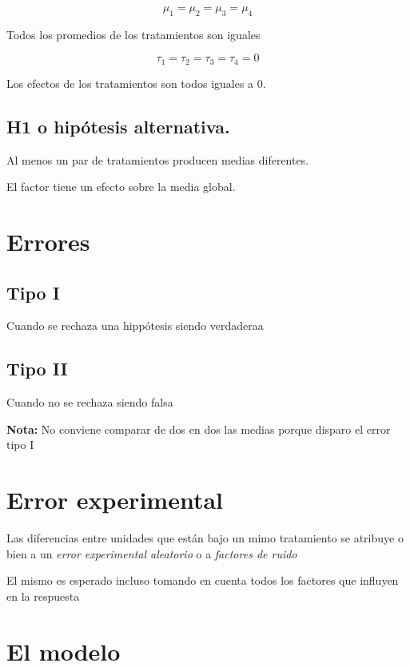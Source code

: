 \documentclass[
]{article}
\begin{document}
\[
\mu_1=\mu_2=\mu_3=\mu_4
\]

Todos los promedios de los tratamientos son iguales

\[
\tau_1=\tau_2=\tau_3=\tau_4=0
\]

Los efectos de los tratamientos son todos iguales a 0.

\subsection{H1 o hipótesis
alternativa.}\label{h1-o-hipuxf3tesis-alternativa.}

Al menos un par de tratamientos producen medias diferentes.

El factor tiene un efecto sobre la media global.

\section{Errores}\label{errores}

\subsection{Tipo I}\label{tipo-i}

Cuando se rechaza una hippótesis siendo verdaderaa

\subsection{Tipo II}\label{tipo-ii}

Cuando no se rechaza siendo falsa

\textbf{Nota:} No conviene comparar de dos en dos las medias porque
disparo el error tipo I

\section{Error experimental}\label{error-experimental}

Las diferencias entre unidades que están bajo un mimo tratamiento se
atribuye o bien a un \emph{error experimental aleatorio} o a
\emph{factores de ruido}

El mismo es esperado incluso tomando en cuenta todos los factores que
influyen en la respuesta

\section{El modelo}\label{el-modelo}
\end{document}
